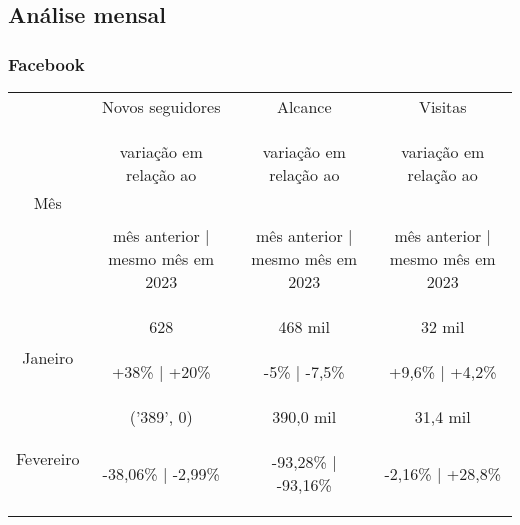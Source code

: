 \documentclass{article}%
\begin{document}
%
\subsection*{Análise mensal}%
\label{subsec:Anlisemensal}%
\subsubsection*{Facebook}%
\label{ssubsec:Facebook}%
\begin{minipage}{\textwidth}%
\centering%
\begin{tabular}{@{}|c|c|c|c|@{}}%
\toprule%
\multirow{3}{*}{Mês}&Novos seguidores&Alcance&Visitas\\%
&\begin{footnotesize}%
variação em relação ao%
\end{footnotesize}&\begin{footnotesize}%
variação em relação ao%
\end{footnotesize}&\begin{footnotesize}%
variação em relação ao%
\end{footnotesize}\\%
&\begin{footnotesize}%
mês anterior | mesmo mês em 2023%
\end{footnotesize}&\begin{footnotesize}%
mês anterior | mesmo mês em 2023%
\end{footnotesize}&\begin{footnotesize}%
mês anterior | mesmo mês em 2023%
\end{footnotesize}\\%
\midrule%
\multirow{2}{*}{Janeiro}&628&468 mil&32 mil\\%
&\begin{footnotesize}%
+38\% | +20\%%
\end{footnotesize}&\begin{footnotesize}%
{-}5\% | {-}7,5\%%
\end{footnotesize}&\begin{footnotesize}%
+9,6\% | +4,2\%%
\end{footnotesize}\\%
\midrule%
\multirow{2}{*}{Fevereiro}&('389', 0) &390,0 mil&31,4 mil\\%
&\begin{footnotesize}%
{-}38,06\% | {-}2,99\%%
\end{footnotesize}&\begin{footnotesize}%
{-}93,28\% | {-}93,16\%%
\end{footnotesize}&\begin{footnotesize}%
{-}2,16\% | +28,8\%%
\end{footnotesize}\\\bottomrule%
%
\end{tabular}%
\end{minipage}%
\end{document}
